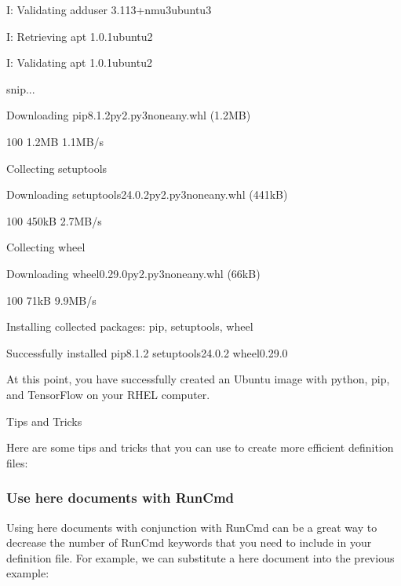 \documentclass[letterpaper,10pt,english]{sphinxmanual}
\begin{document}
\begin{sphinxVerbatim}[commandchars=\\\{\}]
I: Validating adduser 3.113+nmu3ubuntu3

I: Retrieving apt 1.0.1ubuntu2

I: Validating apt 1.0.1ubuntu2

snip...

Downloading pip\PYGZhy{}8.1.2\PYGZhy{}py2.py3\PYGZhy{}none\PYGZhy{}any.whl (1.2MB)

100\PYGZpc{} \textbar{}\PYGZsh{}\PYGZsh{}\PYGZsh{}\PYGZsh{}\PYGZsh{}\PYGZsh{}\PYGZsh{}\PYGZsh{}\PYGZsh{}\PYGZsh{}\PYGZsh{}\PYGZsh{}\PYGZsh{}\PYGZsh{}\PYGZsh{}\PYGZsh{}\PYGZsh{}\PYGZsh{}\PYGZsh{}\PYGZsh{}\PYGZsh{}\PYGZsh{}\PYGZsh{}\PYGZsh{}\PYGZsh{}\PYGZsh{}\PYGZsh{}\PYGZsh{}\PYGZsh{}\PYGZsh{}\PYGZsh{}\PYGZsh{}\textbar{} 1.2MB 1.1MB/s

Collecting setuptools

Downloading setuptools\PYGZhy{}24.0.2\PYGZhy{}py2.py3\PYGZhy{}none\PYGZhy{}any.whl (441kB)

100\PYGZpc{} \textbar{}\PYGZsh{}\PYGZsh{}\PYGZsh{}\PYGZsh{}\PYGZsh{}\PYGZsh{}\PYGZsh{}\PYGZsh{}\PYGZsh{}\PYGZsh{}\PYGZsh{}\PYGZsh{}\PYGZsh{}\PYGZsh{}\PYGZsh{}\PYGZsh{}\PYGZsh{}\PYGZsh{}\PYGZsh{}\PYGZsh{}\PYGZsh{}\PYGZsh{}\PYGZsh{}\PYGZsh{}\PYGZsh{}\PYGZsh{}\PYGZsh{}\PYGZsh{}\PYGZsh{}\PYGZsh{}\PYGZsh{}\PYGZsh{}\textbar{} 450kB 2.7MB/s

Collecting wheel

Downloading wheel\PYGZhy{}0.29.0\PYGZhy{}py2.py3\PYGZhy{}none\PYGZhy{}any.whl (66kB)

100\PYGZpc{} \textbar{}\PYGZsh{}\PYGZsh{}\PYGZsh{}\PYGZsh{}\PYGZsh{}\PYGZsh{}\PYGZsh{}\PYGZsh{}\PYGZsh{}\PYGZsh{}\PYGZsh{}\PYGZsh{}\PYGZsh{}\PYGZsh{}\PYGZsh{}\PYGZsh{}\PYGZsh{}\PYGZsh{}\PYGZsh{}\PYGZsh{}\PYGZsh{}\PYGZsh{}\PYGZsh{}\PYGZsh{}\PYGZsh{}\PYGZsh{}\PYGZsh{}\PYGZsh{}\PYGZsh{}\PYGZsh{}\PYGZsh{}\PYGZsh{}\textbar{} 71kB 9.9MB/s

Installing collected packages: pip, setuptools, wheel

Successfully installed pip\PYGZhy{}8.1.2 setuptools\PYGZhy{}24.0.2 wheel\PYGZhy{}0.29.0

At this point, you have successfully created an Ubuntu image with \PYGZsq{}python\PYGZsq{}, \PYGZsq{}pip\PYGZsq{}, and \PYGZsq{}TensorFlow\PYGZsq{} on your RHEL computer.

Tips and Tricks

Here are some tips and tricks that you can use to create more efficient definition files:
\end{sphinxVerbatim}


\subsubsection{Use here documents with RunCmd}
\label{\detokenize{appendix:use-here-documents-with-runcmd}}
Using here documents with conjunction with RunCmd can be a great way to decrease the number of RunCmd keywords that you need to include
in your definition file. For example, we can substitute a here document into the previous example:
\end{document}
